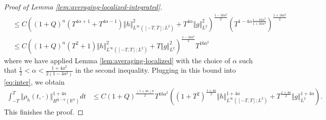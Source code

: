 \documentclass[11pt]{amsart}
\theoremstyle{definition}
\theoremstyle{remark}
\numberwithin{equation}{section}
\newcommand{\nrm}[1]{\Vert#1\Vert}
\newcommand{\0}{\emptyset}
\newcommand{\bbR}{\mathbb R}
\begin{document}
{\begin{proof}[Proof of Lemma \ref{lem:averaging-localized-integrated}]
\begin{equation*}
\begin{split}
				& \leq C\left(  (1+Q)^{n}  \left( T^{4\alpha+1} + T^{4\alpha-1} \right) \Vert h\Vert^2_{L^\infty([-T,T]; L^{2})} + T^{4\alpha} \Vert g \Vert^2_{L^2} \right)^{\frac{1-16a^2}{2}} \left( T^{1-4\alpha\frac{1-16\alpha^2}{1+16\alpha^2}}  \right)^{\frac{1+16a^2}{2}} \\
                &\leq C\left(  (1+Q)^{n}  \left( T^2 + 1 \right) \Vert h\Vert^2_{L^\infty([-T,T]; L^{2})} + T \Vert g \Vert^2_{L^2} \right)^{\frac{1-16a^2}{2}} T^{16a^2}
			\end{split}
		\end{equation*} where we have applied Lemma \ref{lem:averaging-localized} 
		with the choice of $\alpha$ such that $\frac12<\alpha<\frac{1+4a^2}{2(1-4a^2)}$ in the second inequality. Plugging in this bound into \eqref{eq:inter}, we obtain \begin{equation*}
			\begin{split}
				\int_{-T}^{T} \nrm{\rho_{h}(t,\cdot)}^{1+4a}_{H^{\frac14 - a }(\bbR^n)}  dt & \le C (1+Q)^{\frac{(1+4a)n}{2}} T^{16a^2}\left( (1+T^2)^\frac{1+4a}{2}\Vert h\Vert_{L^\infty([-T,T]; L^{2})}^{1+4a} + T^\frac{1+4a}{2} \Vert g \Vert_{L^2}^{1+4a} \right).
			\end{split}
		\end{equation*} This finishes the proof. 
	\end{proof}

}
\end{document}
